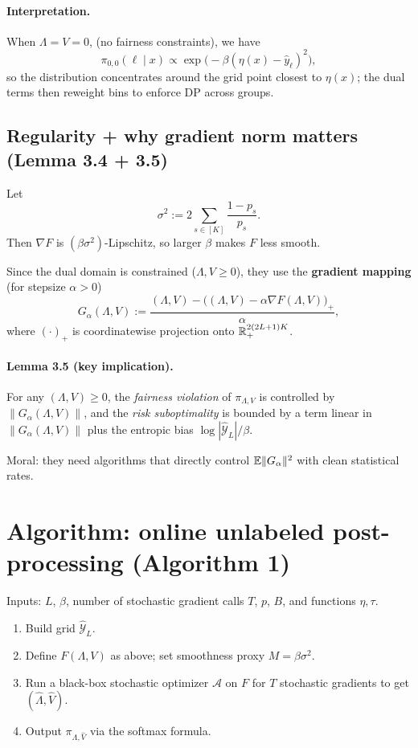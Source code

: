 \documentclass[11pt]{article}
\begin{document}
\paragraph{Interpretation.}
When $\Lambda=V=0$, (no fairness constraints), we have
\begin{equation}
\pi_{0,0}(\ell\mid x)\propto \exp\big(-\beta(\eta(x)-\widehat y_\ell)^2\big),
\end{equation}
so the distribution concentrates around the grid point closest to $\eta(x)$; the dual terms then
reweight bins to enforce DP across groups.

\subsection{Regularity + why gradient norm matters (Lemma 3.4 + 3.5)}
Let
\begin{equation}
\sigma^2 := 2\sum_{s\in[K]}\frac{1-p_s}{p_s}.
\end{equation}
Then $\nabla F$ is $(\beta\sigma^2)$-Lipschitz, so larger $\beta$ makes $F$ less smooth.

Since the dual domain is constrained ($\Lambda,V\ge 0$), they use the \textbf{gradient mapping}
(for stepsize $\alpha>0$)
\begin{equation}
G_\alpha(\Lambda,V):=
\frac{(\Lambda,V)-\big((\Lambda,V)-\alpha\nabla F(\Lambda,V)\big)_+}{\alpha},
\end{equation}
where $(\cdot)_+$ is coordinatewise projection onto $\mathbb{R}_+^{2(2L+1)K}$.

\paragraph{Lemma 3.5 (key implication).}
For any $(\Lambda,V)\ge 0$, the \emph{fairness violation} of $\pi_{\Lambda,V}$ is controlled by
$\|G_\alpha(\Lambda,V)\|$, and the \emph{risk suboptimality} is bounded by a term linear in
$\|G_\alpha(\Lambda,V)\|$ plus the entropic bias $\log|\widehat{\mathcal Y}_L|/\beta$.

Moral: they need algorithms that directly control $\mathbb{E}\|G_\alpha\|^2$ with clean statistical rates.

\section{Algorithm: online unlabeled post-processing (Algorithm 1)}
Inputs: $L$, $\beta$, number of stochastic gradient calls $T$, $p$, $B$, and functions $\eta,\tau$.
\begin{enumerate}
  \item Build grid $\widehat{\mathcal Y}_L$.
  \item Define $F(\Lambda,V)$ as above; set smoothness proxy $M=\beta\sigma^2$.
  \item Run a black-box stochastic optimizer $\mathcal{A}$ on $F$ for $T$ stochastic gradients to get $(\widehat\Lambda,\widehat V)$.
  \item Output $\pi_{\widehat\Lambda,\widehat V}$ via the softmax formula.
\end{enumerate}
\end{document}
